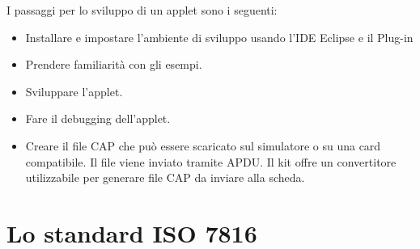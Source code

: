 I passaggi per lo sviluppo di un applet sono i seguenti:
\begin{itemize}
    \item Installare e impostare l'ambiente di sviluppo usando l'IDE Eclipse e il Plug-in
    \item Prendere familiarità con gli esempi.
    \item Sviluppare l'applet.
    \item Fare il debugging dell'applet.
    \item Creare il file CAP che può essere scaricato sul simulatore o su una card compatibile. Il file viene inviato tramite APDU. Il kit offre un convertitore utilizzabile per generare file CAP da inviare alla scheda.
\end{itemize}


\section{Lo standard ISO 7816}

\label{standard}
